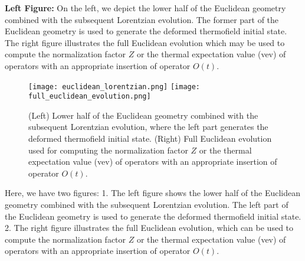 \documentclass{article}
\begin{document}
\textbf{Left Figure:} \small On the left, we depict the lower half of the Euclidean geometry combined with the subsequent Lorentzian evolution. The former part of the Euclidean geometry is used to generate the deformed thermofield initial state. The right figure illustrates the full Euclidean evolution which may be used to compute the normalization factor $Z$ or the thermal expectation value (vev) of operators with an appropriate insertion of operator $O(t)$.

\begin{figure}[h]
    \centering
    \texttt{[image: euclidean\_lorentzian.png]}
    \texttt{[image: full\_euclidean\_evolution.png]}
    \caption{(Left) Lower half of the Euclidean geometry combined with the subsequent Lorentzian evolution, where the left part generates the deformed thermofield initial state. (Right) Full Euclidean evolution used for computing the normalization factor $Z$ or the thermal expectation value (vev) of operators with an appropriate insertion of operator $O(t)$.}
    \label{fig:euclidean_evolution}
\end{figure}

Here, we have two figures:
1. The left figure shows the lower half of the Euclidean geometry combined with the subsequent Lorentzian evolution. The left part of the Euclidean geometry is used to generate the deformed thermofield initial state.
2. The right figure illustrates the full Euclidean evolution, which can be used to compute the normalization factor $Z$ or the thermal expectation value (vev) of operators with an appropriate insertion of operator $O(t)$.
\end{document}
